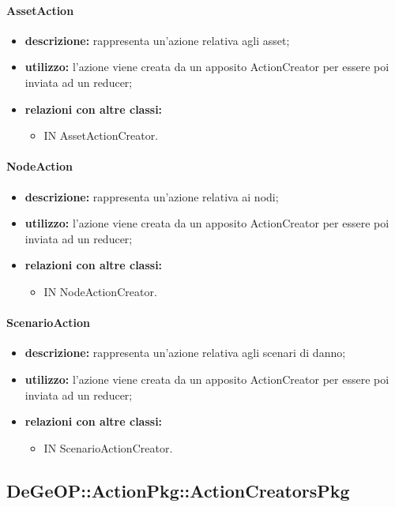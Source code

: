 \paragraph{AssetAction}
\begin{itemize}
	\item \textbf{descrizione:} rappresenta un'azione relativa agli asset;
	\item \textbf{utilizzo:} l'azione viene creata da un apposito ActionCreator per essere poi inviata ad un reducer;
	\item \textbf{relazioni con altre classi:} 
	\begin{itemize}
		\item IN AssetActionCreator.
	\end{itemize}
\end{itemize}
\paragraph{NodeAction}
\begin{itemize}
	\item \textbf{descrizione:} rappresenta un'azione relativa ai nodi;
	\item \textbf{utilizzo:} l'azione viene creata da un apposito ActionCreator per essere poi inviata ad un reducer;
	\item \textbf{relazioni con altre classi:} 
	\begin{itemize}
		\item IN NodeActionCreator.
	\end{itemize}
\end{itemize}
\paragraph{ScenarioAction}
\begin{itemize}
	\item \textbf{descrizione:} rappresenta un'azione relativa agli scenari di danno;
	\item \textbf{utilizzo:} l'azione viene creata da un apposito ActionCreator per essere poi inviata ad un reducer;
	\item \textbf{relazioni con altre classi:} 
	\begin{itemize}
		\item IN ScenarioActionCreator.
	\end{itemize}
\end{itemize}
\newpage
\subsection{DeGeOP::ActionPkg::ActionCreatorsPkg}
\label{pkg::ActionCreatorsPkg}
